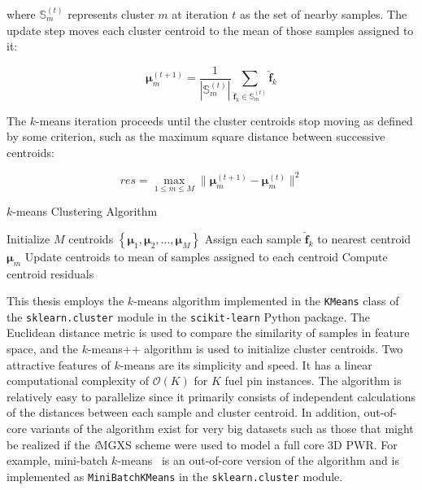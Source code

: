 \noindent where $\mathbb{S}_{m}^{(t)}$ represents cluster $m$ at iteration $t$ as the set of nearby samples. The update step moves each cluster centroid to the mean of those samples assigned to it:

\begin{equation}
\label{eqn:chap10-kmeans-update}
\boldsymbol{\mu}_{m}^{(t+1)} = \frac{1}{|\mathbb{S}_{m}^{(t)}|} \displaystyle\sum\limits_{\boldsymbol{\hat{f}}_{k} \in \mathbb{S}_{m}^{(t)}} \boldsymbol{\hat{f}}_{k}
\end{equation}

The $k$-means iteration proceeds until the cluster centroids stop moving as defined by some criterion, such as the maximum square distance between successive centroids:

\begin{equation}
\label{eqn:chap10-kmeans-residuals}
res = \max_{1 \le m \le M} \|\boldsymbol{\mu}_{m}^{(t+1)} - \boldsymbol{\mu}_{m}^{(t)}\|^{2}
\end{equation}

\begin{algorithm}[ht!]
\caption[$k$-means Clustering Algorithm]{$k$-means Clustering Algorithm}
\label{alg:chap10-kmeans}
\begin{algorithmic}[1]
  \State Initialize $M$ centroids $\left\{ \boldsymbol{\mu}_{1}, \boldsymbol{\mu}_{2}, \dots, \boldsymbol{\mu}_{M} \right\}$
    \State Assign each sample $\boldsymbol{\hat{f}}_{k}$ to nearest centroid $\boldsymbol{\mu}_{m}$ 
    \State Update centroids to mean of samples assigned to each centroid 
    \State Compute centroid residuals 
  \EndWhile
\end{algorithmic}
\end{algorithm}

This thesis employs the $k$-means algorithm implemented in the \texttt{KMeans} class of the \texttt{sklearn.cluster} module in the \texttt{scikit-learn} Python package. The Euclidean distance metric is used to compare the similarity of samples in feature space, and the $k$-means++ algorithm is used to initialize cluster centroids. Two attractive features of $k$-means are its simplicity and speed. It has a linear computational complexity of $\mathcal{O}(K)$ for $K$ fuel pin instances. The algorithm is relatively easy to parallelize since it primarily consists of independent calculations of the distances between each sample and cluster centroid. In addition, out-of-core variants of the algorithm exist for very big datasets such as those that might be realized if the \textit{i}\ac{MGXS} scheme were used to model a full core 3D \ac{PWR}. For example, mini-batch $k$-means~\cite{sculley2010minibatchkmeans} is an out-of-core version of the algorithm and is implemented as \texttt{MiniBatchKMeans} in the \texttt{sklearn.cluster} module.

